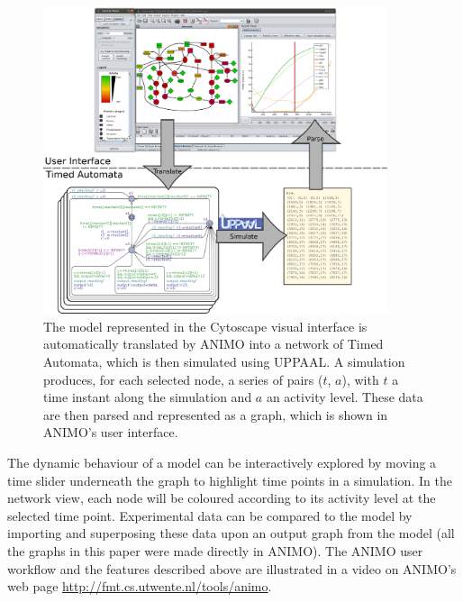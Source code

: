\documentclass{bmcart}
\begin{document}
\begin{figure}[htb]
\begin{center}
\begin{minipage}{\textwidth}
\begin{center}
  \includegraphics[width=0.9\textwidth]{images/animo_simulation_workflow}
\caption{
The model represented in the Cytoscape visual interface is automatically translated by ANIMO
into a network of Timed Automata, which is then simulated using UPPAAL.
A simulation produces, for each selected node, a series of pairs {\sf ($t$, $a$)},
with $t$ a time instant along the simulation and $a$ an activity level. These data are
then parsed and represented as a graph, which is shown in ANIMO's user interface.}\label{fig:animo-sim-workflow}
\end{center}
\end{minipage}
\end{center}
\end{figure}

The dynamic behaviour of a model can be interactively explored by
moving a time slider underneath the graph to highlight time points in a simulation. In the network view,
each node will be coloured according to its activity level at the selected time point.
Experimental data can be compared to the model by importing and superposing these data
upon an output graph from the model (all the graphs in this paper were made directly in ANIMO).
The ANIMO user workflow and the
features described above are illustrated in a video on ANIMO's web page \url{http://fmt.cs.utwente.nl/tools/animo}.
\end{document}
